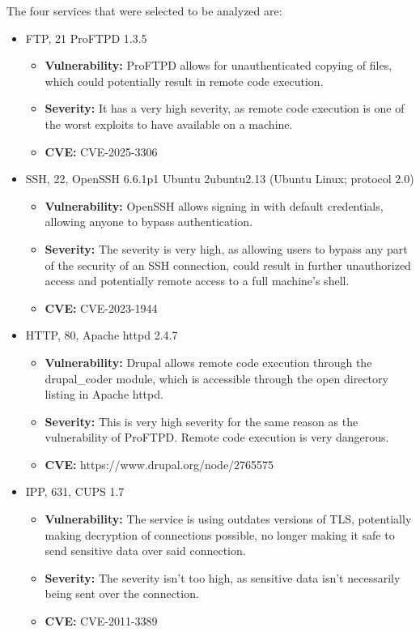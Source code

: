 The four services that were selected to be analyzed are:
\begin{itemize}
    \item FTP, 21 ProFTPD 1.3.5
          \begin{itemize}
              \item \textbf{Vulnerability:} ProFTPD allows for unauthenticated copying of files, which could potentially result in remote code execution.
              \item \textbf{Severity:} It has a very high severity, as remote code execution is one of the worst exploits to have available on a machine.
              \item \textbf{CVE:} CVE-2025-3306
          \end{itemize}
    \item SSH, 22, OpenSSH 6.6.1p1 Ubuntu 2ubuntu2.13 (Ubuntu Linux; protocol 2.0)
          \begin{itemize}
              \item \textbf{Vulnerability:} OpenSSH allows signing in with default credentials, allowing anyone to bypass authentication.
              \item \textbf{Severity:} The severity is very high, as allowing users to bypass any part of the security of an SSH connection, could result in further unauthorized access and potentially remote access to a full machine's shell.
              \item \textbf{CVE:} CVE-2023-1944
          \end{itemize}
    \item HTTP, 80, Apache httpd 2.4.7
          \begin{itemize}
              \item \textbf{Vulnerability:} Drupal allows remote code execution through the drupal\_coder module, which is accessible through the open directory listing in Apache httpd.
              \item \textbf{Severity:} This is very high severity for the same reason as the vulnerability of ProFTPD. Remote code execution is very dangerous.
              \item \textbf{CVE:} https://www.drupal.org/node/2765575
          \end{itemize}
    \item IPP, 631, CUPS 1.7
          \begin{itemize}
              \item \textbf{Vulnerability:} The service is using outdates versions of TLS, potentially making decryption of connections possible, no longer making it safe to send sensitive data over said connection.
              \item \textbf{Severity:} The severity isn't too high, as sensitive data isn't necessarily being sent over the connection.
              \item \textbf{CVE:} CVE-2011-3389
          \end{itemize}
\end{itemize}

